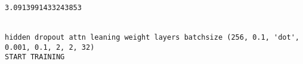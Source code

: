 \documentclass[11pt]{article}
\begin{document}
    \begin{center}
    \end{center}
    { \hspace*{\fill} \\}
    
    \begin{center}
    \end{center}
    { \hspace*{\fill} \\}
    
    \begin{Verbatim}[commandchars=\\\{\}]
3.0913991433243853


hidden dropout attn leaning weight layers batchsize (256, 0.1, 'dot', 0.001, 0.1, 2, 2, 32)
START TRAINING



    \end{Verbatim}

    \begin{center}
    \end{center}
    { \hspace*{\fill} \\}
    
    \begin{center}
    \end{center}
    { \hspace*{\fill} \\}
    
    \begin{center}
    \end{center}
    { \hspace*{\fill} \\}
    
    \begin{center}
    \end{center}
    { \hspace*{\fill} \\}
    
    \begin{center}
    \end{center}
    { \hspace*{\fill} \\}
    
\end{document}
